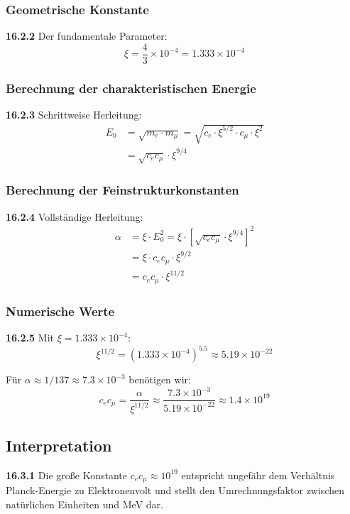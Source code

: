 \documentclass[12pt,a4paper]{article}
\newcommand{\xipar}{\xi}
\begin{document}
\subsubsection{Geometrische Konstante}
\noindent \textbf{16.2.2} Der fundamentale Parameter:
\begin{equation}
	\xipar = \frac{4}{3} \times 10^{-4} = 1.333 \times 10^{-4}
\end{equation}

\subsubsection{Berechnung der charakteristischen Energie}
\noindent \textbf{16.2.3} Schrittweise Herleitung:
\begin{align}
	E_0 &= \sqrt{m_e \cdot m_\mu} = \sqrt{c_e \cdot \xipar^{5/2} \cdot c_\mu \cdot \xipar^2} \\
	&= \sqrt{c_e c_\mu} \cdot \xipar^{9/4}
\end{align}

\subsubsection{Berechnung der Feinstrukturkonstanten}
\noindent \textbf{16.2.4} Vollständige Herleitung:
\begin{align}
	\alpha &= \xipar \cdot E_0^2 = \xipar \cdot \left[ \sqrt{c_e c_\mu} \cdot \xipar^{9/4} \right]^2 \\
	&= \xipar \cdot c_e c_\mu \cdot \xipar^{9/2} \\
	&= c_e c_\mu \cdot \xipar^{11/2}
\end{align}

\subsubsection{Numerische Werte}
\noindent \textbf{16.2.5} Mit $\xipar = 1.333 \times 10^{-4}$:
\begin{equation}
	\xipar^{11/2} = (1.333 \times 10^{-4})^{5.5} \approx 5.19 \times 10^{-22}
\end{equation}

Für $\alpha \approx 1/137 \approx 7.3 \times 10^{-3}$ benötigen wir:
\begin{equation}
	c_e c_\mu = \frac{\alpha}{\xipar^{11/2}} \approx \frac{7.3 \times 10^{-3}}{5.19 \times 10^{-22}} \approx 1.4 \times 10^{19}
\end{equation}

\subsection{Interpretation}
\noindent \textbf{16.3.1} Die große Konstante $c_e c_\mu \approx 10^{19}$ entspricht ungefähr dem Verhältnis Planck-Energie zu Elektronenvolt und stellt den Umrechnungsfaktor zwischen natürlichen Einheiten und MeV dar.
\end{document}
